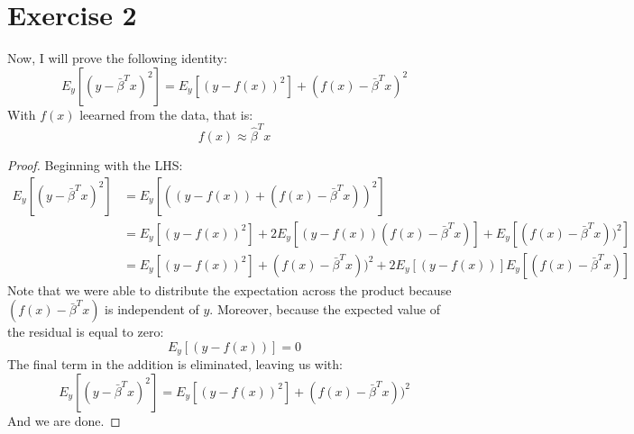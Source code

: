 \documentclass{article}
\begin{document}
\newpage
\section*{Exercise 2}
Now, I will prove the following identity:
$$E_y[(y-\bar{\beta}^Tx)^2] = E_y[(y-f(x))^2]+(f(x)-\bar{\beta}^Tx)^2$$
With $f(x)$ leearned from the data, that is:
$$f(x) \approx \hat{\beta}^Tx$$
\begin{proof}
Beginning with the LHS:
\begin{align*}
	E_y[(y-\bar{\beta}^Tx)^2] &= E_y[((y-f(x))+(f(x)-\bar{\beta}^Tx))^2] \\
	&= E_y[(y-f(x))^2]+2E_y[(y-f(x))(f(x)-\bar{\beta}^Tx)] + E_y[(f(x)-\bar{\beta}^Tx))^2] \\
	&= E_y[(y-f(x))^2]+(f(x)-\bar{\beta}^Tx))^2+2E_y[(y-f(x))]E_y[(f(x)-\bar{\beta}^Tx)]
\end{align*}
Note that we were able to distribute the expectation across the product because $(f(x)-\bar{\beta}^Tx)$ is independent of $y$.  Moreover, because the expected value of the residual is equal to zero:
$$E_y[(y-f(x))] = 0$$
The final term in the addition is eliminated, leaving us with:
$$E_y[(y-\bar{\beta}^Tx)^2] = E_y[(y-f(x))^2]+(f(x)-\bar{\beta}^Tx))^2$$
And we are done.
\end{proof}
\end{document}
